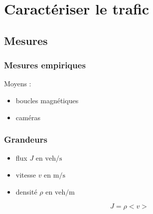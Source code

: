 \documentclass[slidetop,11pt]{beamer}
\begin{document}
\section{Caractériser le trafic}
	\subsection{Mesures}
\begin{frame}
	\frametitle{Mesures empiriques}
	Moyens :
	\begin{itemize}
		\item boucles magnétiques
		\item caméras
	\end{itemize}
\end{frame}

\begin{frame}
	\frametitle{Grandeurs}
	\begin{itemize}
		\item flux $J \text{ en } \mathrm{veh}/\mathrm{s}$
		\item vitesse $v \text{ en } \mathrm{m}/\mathrm{s}$
		\item densité $\rho \text{ en } \mathrm{veh}/\mathrm{m}$
	\end{itemize}
	$$J = \rho<v>$$
\end{frame}
\end{document}
